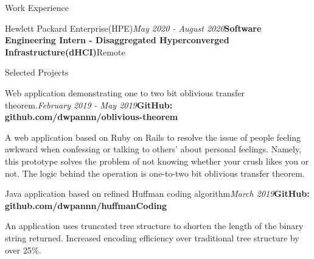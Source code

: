 \documentclass{resume}
\begin{document}
\begin{rSection}{Work Experience}
\begin{rSubsection}{Hewlett Packard Enterprise(HPE)}{\em May 2020 - August 2020}{\textbf{Software Engineering Intern - Disaggregated Hyperconverged Infrastructure(dHCI)}}{Remote}{}
\end{rSubsection}








\end{rSection}

\begin{rSection}{Selected Projects}


\begin{rSubsection}{Web application demonstrating one to two bit oblivious transfer theorem.}{\em February 2019 - May 2019}{\textbf{GitHub: github.com/dwpannn/oblivious-theorem}}{}
\item A web application based on Ruby on Rails to resolve the issue of people feeling awkward when confessing or talking to others' about personal feelings. Namely, this prototype solves the problem of not knowing whether your crush likes you or not. The logic behind the operation is one-to-two bit oblivious transfer theorem. 
\end{rSubsection}


\begin{rSubsection}{Java application based on refined Huffman coding algorithm}{\em March 2019}{\textbf{GitHub: github.com/dwpannn/huffmanCoding}}{}
\item An application uses truncated tree structure to shorten the length of the binary string returned. Increased encoding efficiency over traditional tree structure by over 25\%.
\end{rSubsection}
\end{rSection}
\end{document}
